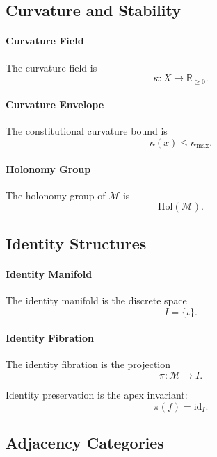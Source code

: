 \subsection{Curvature and Stability}

\paragraph{Curvature Field}
The curvature field is
\[
\kappa : X \to \mathbb{R}_{\ge 0}.
\]

\paragraph{Curvature Envelope}
The constitutional curvature bound is
\[
\kappa(x) \le \kappa_{\max}.
\]

\paragraph{Holonomy Group}
The holonomy group of $\mathcal{M}$ is
\[
\mathrm{Hol}(\mathcal{M}).
\]


\subsection{Identity Structures}

\paragraph{Identity Manifold}
The identity manifold is the discrete space
\[
I = \{\iota\}.
\]

\paragraph{Identity Fibration}
The identity fibration is the projection
\[
\pi : \mathcal{M} \to I.
\]

Identity preservation is the apex invariant:
\[
\pi(f) = \mathrm{id}_I.
\]


\subsection{Adjacency Categories}

